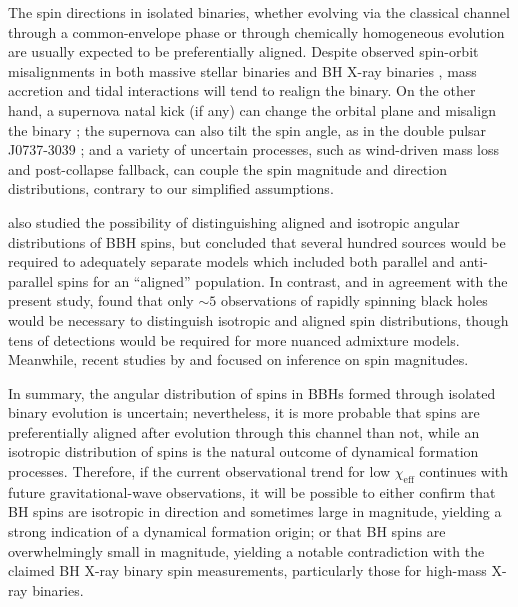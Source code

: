 \documentclass[modern,linenumbers]{aastex61}
\newcommand{\chieff}{\chi_\mathrm{eff}}
\begin{document}
The spin directions in isolated binaries, whether evolving via the
classical channel through a common-envelope phase
\citep{TutukovYungelson:1973,TutukovYungelson:1993,Lipunov:1997,2016Natur.534..512B,Stevenson:2017}
or through chemically homogeneous evolution
\citep{MandeldeMink:2016,Marchant:2016} are usually expected to be
preferentially aligned.  Despite observed spin-orbit misalignments in
both massive stellar binaries
\citep{Albrecht:2009,2014ApJ...785...83A} and BH X-ray binaries
\citep{Orosz:2001,Martin:2008b,Martin:2008,MorningstarMiller:2014},
mass accretion and tidal interactions will tend to realign the binary.
On the other hand, a supernova natal kick (if any) can change the
orbital plane and misalign the binary
\citep{2000ApJ...541..319K,2013PhRvD..87j4028G}; the supernova can
also tilt the spin angle, as in the double pulsar J0737-3039
\citep{2011ApJ...742...81F}; and a variety of uncertain processes,
such as wind-driven mass loss and post-collapse fallback, can couple
the spin magnitude and direction distributions, contrary to our
simplified assumptions.

\citet{2017CQGra..34cLT01V} also studied the possibility of
distinguishing aligned and isotropic angular distributions of \ac{BBH}
spins, but concluded that several hundred sources would be required to
adequately separate models which included both parallel and
anti-parallel spins for an ``aligned'' population.  In contrast, and
in agreement with the present study, \citet{Stevenson:2017spin} found
that only $\sim 5$ observations of rapidly spinning black holes would
be necessary to distinguish isotropic and aligned spin distributions,
though tens of detections would be required for more nuanced admixture
models.  Meanwhile, recent studies by
\citet{2017arXiv170306869F} and \citet{2017arXiv170306223G} focused on inference
on spin magnitudes.

In summary, the angular distribution of spins in \acp{BBH} formed
through isolated binary evolution is uncertain; nevertheless, it is
more probable that spins are preferentially aligned after evolution
through this channel than not, while an isotropic distribution of
spins is the natural outcome of dynamical formation processes.
Therefore, if the current observational trend for low $\chieff$
continues with future gravitational-wave observations, it will be
possible to either confirm that \ac{BH} spins are isotropic in
direction and sometimes large in magnitude, yielding a strong
indication of a dynamical formation origin; or that \ac{BH} spins are
overwhelmingly small in magnitude, yielding a notable contradiction
with the claimed \ac{BH} X-ray binary spin measurements, particularly
those for high-mass X-ray binaries.
\end{document}
